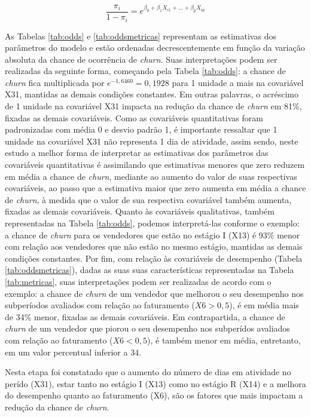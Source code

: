 \documentclass[twocolumn]{rbef}
\newcommand{\1}{\mathbbm{1}}
\begin{document}
\begin{equation}
\dfrac{\pi_i}{1-\pi_i}= e^{\beta_0 + \beta_1 X_{i1} + ... +  \beta_p X_{ip}}\label{eq:odds}
\end{equation}

As Tabelas \ref{tab:odds} e \ref{tab:oddsmetricas} representam as estimativas dos parâmetros do modelo e estão ordenadas decrescentemente em função da variação absoluta da chance de ocorrência de \textit{churn}. Suas interpretações podem ser realizadas da seguinte forma, começando pela Tabela \ref{tab:odds}: a chance de \textit{churn} fica multiplicada por \(e^{-1,6460}=0,1928\) para 1 unidade a mais na covariável X31, mantidas as demais condições constantes. Em outras palavras, o acréscimo de 1 unidade na covariável X31 impacta na redução da chance de \textit{churn} em 81\%, fixadas as demais covariáveis. Como as covariáveis quantitativas foram padronizadas com média 0 e desvio padrão 1, é importante ressaltar que 1 unidade na covariável X31 não representa 1 dia de atividade, assim sendo, neste estudo a melhor forma de interpretar as estimativas dos parâmetros das covariáveis quantitativas é assimilando que estimativas menores que zero reduzem em média a chance de \textit{churn}, mediante ao aumento do valor de suas respectivas covariáveis, ao passo que a estimativa maior que zero aumenta em média a chance de \textit{churn}, à medida que o valor de sua respectiva covariável também aumenta, fixadas as demais covariáveis. Quanto às covariáveis qualitativas, também representadas na Tabela \ref{tab:odds}, podemos interpretá-las conforme o exemplo: a chance de \textit{churn} para os vendedores que estão no estágio I (X13) é 93\% menor com relação aos vendedores que não estão no mesmo estágio, mantidas as demais condições constantes. Por fim, com relação às covariáveis de desempenho (Tabela \ref{tab:oddsmetricas}), dadas as suas suas características representadas na Tabela \ref{tab:metricas}, suas interpretações podem ser realizadas de acordo com o exemplo: a chance de \textit{churn} de um vendedor que melhorou o seu desempenho nos subperíodos avaliados com relação ao faturamento (\(X6>0,5\)), é em média mais de 34\% menor, fixadas as demais covariáveis. Em contrapartida, a chance de \textit{churn} de um vendedor que piorou o seu desempenho nos subperídos avaliados com relação ao faturamento (\(X6<0,5\)), é também menor em média, entretanto, em um valor percentual inferior a 34.

Nesta etapa foi constatado que o aumento do número de dias em atividade no perído (X31), estar tanto no estágio I (X13) como no estágio R (X14) e a melhora do desempenho quanto ao faturamento (X6), são os fatores que mais impactam a redução da chance de \textit{churn}.
\end{document}
